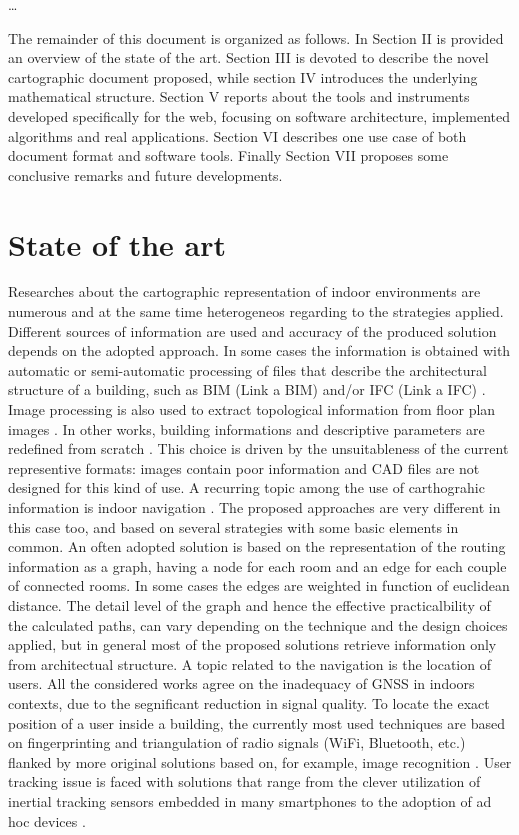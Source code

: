 \documentclass{sig-alternate}
\begin{document}
\ldots{}

The remainder of this document is organized as follows. In Section II is
provided an overview of the state of the art. Section III is devoted to
describe the novel cartographic document proposed, while section IV introduces
the underlying mathematical structure. Section V reports about the tools and
instruments developed specifically for the web, focusing on software
architecture, implemented algorithms and real applications. Section VI
describes one use case of both document format and software tools. Finally
Section VII proposes some conclusive remarks and future developments.

\section{State of the art}\label{state-of-the-art}

Researches about the cartographic representation of indoor environments are
numerous and at the same time heterogeneos regarding to the strategies
applied. Different sources of information are used and accuracy of the
produced solution depends on the adopted approach. In some cases the
information  is obtained with automatic or semi-automatic processing of files
that describe the  architectural structure of a building, such as BIM (Link a
BIM) and/or IFC (Link a IFC) \cite{6816739}. Image processing is also used to
extract topological information from floor plan images \cite{6878152}. In
other works, building informations and descriptive parameters are redefined
from scratch \cite{6418876}.  This choice is driven by the unsuitableness of
the current representive formats:  images contain poor information and CAD
files are not designed for this kind of use. A recurring topic among the use
of carthograhic information is indoor navigation
\cite{6878152,6418876,6816739}. The proposed approaches are very different in
this case too, and based on several strategies with some basic elements in
common. An often adopted solution is based on the representation of the
routing information as a graph, having a node for each room and an edge for
each couple of connected rooms. In some cases the edges are weighted in
function of euclidean distance. The detail level of the graph and hence the
effective practicalbility of the calculated paths, can vary depending on the
technique and the design choices applied, but in general most of the proposed
solutions retrieve information only from architectual structure. A topic
related to the navigation is the location of users. All the considered works
agree on the inadequacy of GNSS in indoors contexts, due to the segnificant
reduction in signal quality. To locate the exact position of a user inside a
building, the currently most used techniques are based on fingerprinting and
triangulation of radio signals (WiFi, Bluetooth, etc.) flanked by more
original solutions based on, for example, image recognition \cite{6815564}.
User tracking issue is faced with solutions that range from the clever
utilization of inertial tracking sensors embedded in many smartphones
\cite{6815564} to the adoption of ad hoc devices \cite{6878152}.
\end{document}
